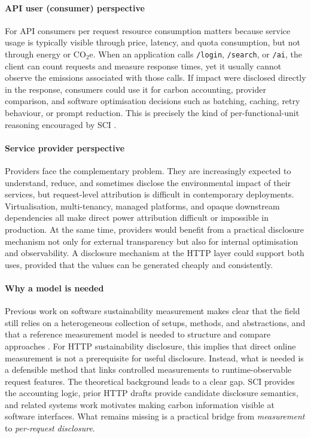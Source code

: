 \paragraph{API user (consumer) perspective}
For API consumers per request resource consumption matters because service usage is typically visible through price, latency, and quota consumption, but not through energy or \(\mathrm{CO_2e}\). When an application calls \texttt{/login}, \texttt{/search}, or \texttt{/ai}, the client can count requests and measure response times, yet it usually cannot observe the emissions associated with those calls. If impact were disclosed directly in the response, consumers could use it for carbon accounting, provider comparison, and software optimisation decisions such as batching, caching, retry behaviour, or prompt reduction. This is precisely the kind of per-functional-unit reasoning encouraged by SCI \cite{gsf-sci}.

\paragraph{Service provider perspective}
Providers face the complementary problem. They are increasingly expected to understand, reduce, and sometimes disclose the environmental impact of their services, but request-level attribution is difficult in contemporary deployments. Virtualisation, multi-tenancy, managed platforms, and opaque downstream dependencies all make direct power attribution difficult or impossible in production. At the same time, providers would benefit from a practical disclosure mechanism not only for external transparency but also for internal optimisation and observability. A disclosure mechanism at the HTTP layer could support both uses, provided that the values can be generated cheaply and consistently.

\paragraph{Why a model is needed}
Previous work on software sustainability measurement makes clear that the field still relies on a heterogeneous collection of setups, methods, and abstractions, and that a reference measurement model is needed to structure and compare approaches \cite{guldner2024gsmm}. For HTTP sustainability disclosure, this implies that direct online measurement is not a prerequisite for useful disclosure. Instead, what is needed is a defensible method that links controlled measurements to runtime-observable request features. The theoretical background leads to a clear gap. SCI provides the accounting logic, prior HTTP drafts provide candidate disclosure semantics, and related systems work motivates making carbon information visible at software interfaces. What remains missing is a practical bridge from \emph{measurement} to \emph{per-request disclosure}.


